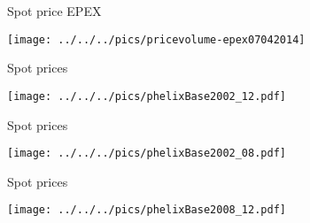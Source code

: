 {Spot price EPEX}
\begin{center}
\texttt{[image: ../../../pics/pricevolume-epex07042014]}
\end{center}

{Spot prices}
\begin{center}
\texttt{[image: ../../../pics/phelixBase2002\_12.pdf]}
\end{center}

{Spot prices}
\begin{center}
\texttt{[image: ../../../pics/phelixBase2002\_08.pdf]}
\end{center}

{Spot prices}
\begin{center}
\texttt{[image: ../../../pics/phelixBase2008\_12.pdf]}
\end{center}
